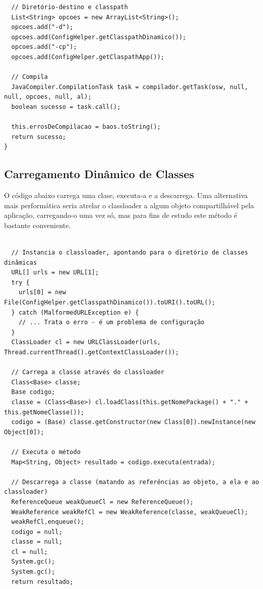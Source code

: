 \documentclass{abnt}
\newenvironment{mylisting}
{\begin{list}{}{\setlength{\leftmargin}{1em}}\item\scriptsize\bfseries}
{\end{list}}
\begin{document}
\begin{mylisting}
\begin{verbatim}
  // Diretório-destino e classpath
  List<String> opcoes = new ArrayList<String>();
  opcoes.add("-d");
  opcoes.add(ConfigHelper.getClasspathDinamico());
  opcoes.add("-cp");
  opcoes.add(ConfigHelper.getClaspathApp());

  // Compila
  JavaCompiler.CompilationTask task = compilador.getTask(osw, null, null, opcoes, null, al);
  boolean sucesso = task.call();

  this.errosDeCompilacao = baos.toString();
  return sucesso;
}
\end{verbatim}
\end{mylisting}

\subsection{Carregamento Dinâmico de Classes}

O código abaixo carrega uma clase, executa-a e a descarrega. Uma alternativa mais performática seria atrelar o classloader a algum objeto compartilhável pela aplicação, carregando-o uma vez só, mas para fins de estudo este método é bastante conveniente.

\begin{mylisting}
\begin{verbatim}
  
  // Instancia o classloader, apontando para o diretório de classes dinâmicas
  URL[] urls = new URL[1];
  try {
    urls[0] = new File(ConfigHelper.getClasspathDinamico()).toURI().toURL();
  } catch (MalformedURLException e) {
    // ... Trata o erro - é um problema de configuração
  }
  ClassLoader cl = new URLClassLoader(urls, Thread.currentThread().getContextClassLoader());
  
  // Carrega a classe através do classloader
  Class<Base> classe;
  Base codigo;
  classe = (Class<Base>) cl.loadClass(this.getNomePackage() + "." + this.getNomeClasse());
  codigo = (Base) classe.getConstructor(new Class[0]).newInstance(new Object[0]);

  // Executa o método
  Map<String, Object> resultado = codigo.executa(entrada);

  // Descarrega a classe (matando as referências ao objeto, a ela e ao classloader)
  ReferenceQueue weakQueueCl = new ReferenceQueue();
  WeakReference weakRefCl = new WeakReference(classe, weakQueueCl);
  weakRefCl.enqueue();
  codigo = null;
  classe = null;
  cl = null;
  System.gc();
  System.gc();
  return resultado;

\end{verbatim}
\end{mylisting}
\end{document}
